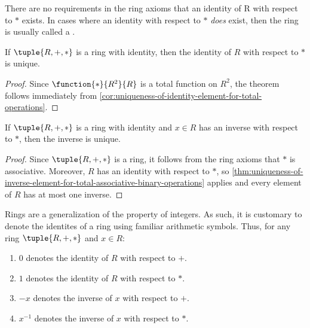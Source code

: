\noindent
There are no requirements in the ring axioms that an identity of R with respect to \( \ast \) exists. In cases where an identity
with respect to \( \ast \) \emph{does} exist, then the ring is usually called a .

\begin{thm}
    \label{thm:ring-uniqueness-of-identity}
    If \( \tuple{R,+,\ast} \) is a ring with identity, then the identity of \( R \) with respect to \( \ast \) is unique.
\end{thm}

\begin{proof}
    Since \( \function{\ast}{R^{2}}{R} \) is a total function on \( R^{2} \), the theorem follows immediately from
    \cref{cor:uniqueness-of-identity-element-for-total-operations}.
\end{proof}

\begin{thm}
    \label{thm:ring-uniqueness-of-star-inverse}
    If \( \tuple{R,+,\ast} \) is a ring with identity and \( x \in R \) has an inverse with respect to \( \ast \), then the inverse is unique.
\end{thm}

\begin{proof}
    Since \( \tuple{R,+,\ast} \) is a ring, it follows from the ring axioms that \( \ast \) is associative. Moreover, \( R \) has an identity
    with respect to \( \ast \), so \cref{thm:uniqueness-of-inverse-element-for-total-associative-binary-operations} applies and every element of
    \( R \) has at most one inverse.
\end{proof}

\begin{notation}
    \label{notation:ring-denote-identities-and-inverses-using-arithmetic-symbols}
    Rings are a generalization of the property of integers.
    As such, it is customary to denote the identites of a ring using familiar arithmetic symbols.
    Thus, for any ring \( \tuple{R, +, \ast} \) and \( x \in R \):
    \begin{enumerate}[topsep=2pt,noitemsep,label=\textup{\texttt{(\alph*)}}]
        \item \( 0 \) denotes the identity of \( R \) with respect to \( + \).
        \item \( 1 \) denotes the identity of \( R \) with respect to \( \ast \).
        \item \( -x \) denotes the inverse of \( x \) with respect to \( + \).
        \item \( x^{-1} \) denotes the inverse of \( x \) with respect to \( \ast \).
    \end{enumerate}
\end{notation}

